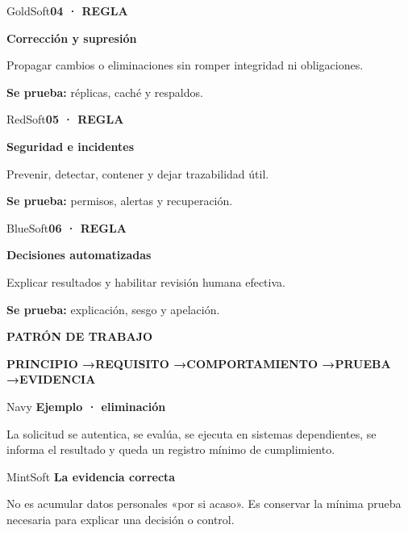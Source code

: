\documentclass[11pt,a4paper]{article}
\newcommand{\eyebrow}[1]{\fontsize{8.5}{10}\selectfont\bfseries\color{Red}\MakeUppercase{#1}}
\newcommand{\cardtitle}[1]{\fontsize{10}{12}\selectfont\bfseries\color{Charcoal}#1}
\newcommand{\smallcopy}[1]{\fontsize{9.8}{13}\selectfont\color{Charcoal}#1}
\newcommand{\microcopy}[1]{\fontsize{8.7}{11}\selectfont\color{Neutral}#1}
\newcommand{\twocol}[2]{%
  \begin{minipage}[t]{0.485\textwidth}#1\end{minipage}\hfill
  \begin{minipage}[t]{0.485\textwidth}#2\end{minipage}
}
\newcommand{\threecol}[3]{%
  \begin{minipage}[t]{0.316\textwidth}#1\end{minipage}\hfill
  \begin{minipage}[t]{0.316\textwidth}#2\end{minipage}\hfill
  \begin{minipage}[t]{0.316\textwidth}#3\end{minipage}
}
\begin{document}
\threecol{
  \begin{softcard}{GoldSoft}\eyebrow{04 · Regla}\par\vspace{2mm}\cardtitle{Corrección y supresión}\par\vspace{2mm}\smallcopy{Propagar cambios o eliminaciones sin romper integridad ni obligaciones.}\par\vspace{3mm}\microcopy{\textbf{Se prueba:} réplicas, caché y respaldos.}\end{softcard}
}{
  \begin{softcard}{RedSoft}\eyebrow{05 · Regla}\par\vspace{2mm}\cardtitle{Seguridad e incidentes}\par\vspace{2mm}\smallcopy{Prevenir, detectar, contener y dejar trazabilidad útil.}\par\vspace{3mm}\microcopy{\textbf{Se prueba:} permisos, alertas y recuperación.}\end{softcard}
}{
  \begin{softcard}{BlueSoft}\eyebrow{06 · Regla}\par\vspace{2mm}\cardtitle{Decisiones automatizadas}\par\vspace{2mm}\smallcopy{Explicar resultados y habilitar revisión humana efectiva.}\par\vspace{3mm}\microcopy{\textbf{Se prueba:} explicación, sesgo y apelación.}\end{softcard}
}

\vspace{7mm}
\begin{card}
  \eyebrow{Patrón de trabajo}\par\vspace{3mm}
  \centering
  \fontsize{11.5}{15}\selectfont\bfseries\color{Navy}
  PRINCIPIO \quad→\quad REQUISITO \quad→\quad COMPORTAMIENTO \quad→\quad PRUEBA \quad→\quad EVIDENCIA
\end{card}

\vspace{7mm}
\twocol{
  \begin{softcard}{Navy}
    \color{White}\cardtitle{\color{White}Ejemplo · eliminación}\par\vspace{2mm}
    \fontsize{9.3}{12.5}\selectfont La solicitud se autentica, se evalúa, se ejecuta en sistemas dependientes, se informa el resultado y queda un registro mínimo de cumplimiento.
  \end{softcard}
}{
  \begin{softcard}{MintSoft}
    \cardtitle{La evidencia correcta}\par\vspace{2mm}
    \smallcopy{No es acumular datos personales «por si acaso». Es conservar la mínima prueba necesaria para explicar una decisión o control.}
  \end{softcard}
}
\end{document}
